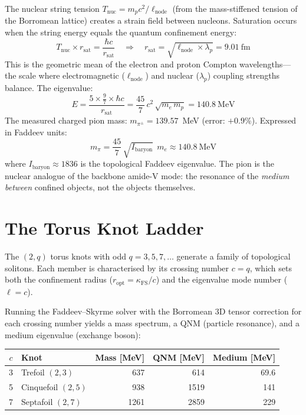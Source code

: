 The nuclear string tension $T_\mathrm{nuc} = m_p c^2 / \ell_\mathrm{node}$ (from the mass-stiffened tension of the Borromean lattice) creates a strain field between nucleons.  Saturation occurs when the string energy equals the quantum confinement energy:
\begin{equation}
    T_\mathrm{nuc} \times r_\mathrm{sat} = \frac{\hbar c}{r_\mathrm{sat}}
    \quad\Longrightarrow\quad
    r_\mathrm{sat} = \sqrt{\ell_\mathrm{node} \times \lambda_p} = 9.01~\mathrm{fm}
\end{equation}
This is the geometric mean of the electron and proton Compton wavelengths---the scale where electromagnetic ($\ell_\mathrm{node}$) and nuclear ($\lambda_p$) coupling strengths balance.  The eigenvalue:
\begin{equation}
    E = \frac{5 \times \tfrac{9}{7} \times \hbar c}{r_\mathrm{sat}} = \frac{45}{7}\,c^2\,\sqrt{m_e\,m_p} = 140.8~\mathrm{MeV}
\end{equation}
\noindent The measured charged pion mass: $m_{\pi^\pm} = 139.57$~MeV (error: $+0.9\%$).  Expressed in Faddeev units:
\begin{equation}
    \boxed{m_\pi = \frac{45}{7}\,\sqrt{I_\mathrm{baryon}}\;\,m_e \approx 140.8~\mathrm{MeV}}
\end{equation}
where $I_\mathrm{baryon} \approx 1836$ is the topological Faddeev eigenvalue.  The pion is the nuclear analogue of the backbone amide-V mode: the resonance of the \emph{medium between} confined objects, not the objects themselves.


\section{The Torus Knot Ladder}
\label{sec:knot_ladder}

The $(2,q)$ torus knots with odd $q = 3, 5, 7, \ldots$ generate a family of topological solitons.  Each member is characterised by its crossing number $c = q$, which sets both the confinement radius ($r_\mathrm{opt} = \kappa_\mathrm{FS}/c$) and the eigenvalue mode number ($\ell = c$).

Running the Faddeev--Skyrme solver with the Borromean 3D tensor correction for each crossing number yields a mass spectrum, a QNM (particle resonance), and a medium eigenvalue (exchange boson):

\begin{center}
\renewcommand{\arraystretch}{1.3}
\begin{tabular}{c l r r r}
\toprule
$c$ & Knot & Mass [MeV] & QNM [MeV] & Medium [MeV] \\
\midrule
3 & Trefoil $(2,3)$ & 637 & 614 & 69.6 \\
5 & Cinquefoil $(2,5)$ & 938 & 1519 & 141 \\
7 & Septafoil $(2,7)$ & 1261 & 2859 & 229 \\
\bottomrule
\end{tabular}
\end{center}

